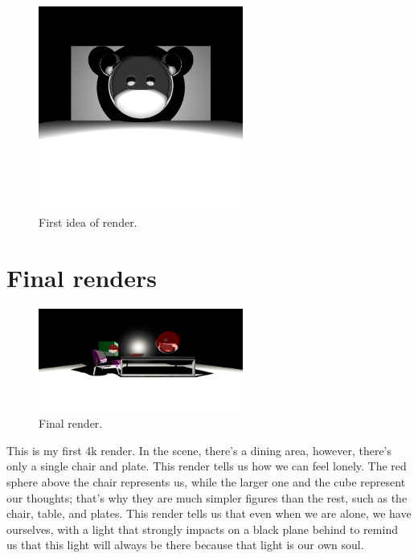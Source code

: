 \documentclass[12pt]{article}
\begin{document}
\begin{figure}[h]
	\centering
	\includegraphics[width=0.6\textwidth]{image20.png}
	\caption{First idea of render.}
	\label{fig:image5}
\end{figure}

\clearpage

\section{Final renders}

\begin{figure}[h]
	\centering
	\includegraphics[width=0.6\textwidth]{FINAL1.png}
	\caption{Final render.}
	\label{fig:image6}
\end{figure}

	This is my first 4k render. In the scene, there's a dining area, however, there's only a single chair and plate. This render tells us how we can feel lonely. The red sphere above the chair represents us, while the larger one and the cube represent our thoughts; that's why they are much simpler figures than the rest, such as the chair, table, and plates. This render tells us that even when we are alone, we have ourselves, with a light that strongly impacts on a black plane behind to remind us that this light will always be there because that light is our own soul.\\
\end{document}
